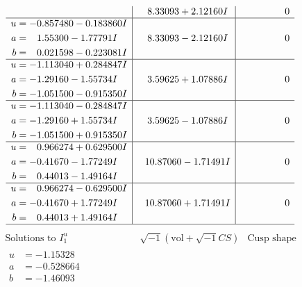 \documentclass[1p]{elsarticle_modified}
\theoremstyle{definition}
\newcommand{\I}{\sqrt{-1}}
\begin{document}
$$\begin{array}{c|c|c}
 & \phantom{-}8.33093 + 2.12160 I & \phantom{-0.000000 } 0 \\ \hline\begin{aligned}
u &= -0.857480 - 0.183860 I \\
a &= \phantom{-}1.55300 - 1.77791 I \\
b &= \phantom{-}0.021598 - 0.223081 I\end{aligned}
 & \phantom{-}8.33093 - 2.12160 I & \phantom{-0.000000 } 0 \\ \hline\begin{aligned}
u &= -1.113040 + 0.284847 I \\
a &= -1.29160 - 1.55734 I \\
b &= -1.051500 - 0.915350 I\end{aligned}
 & \phantom{-}3.59625 + 1.07886 I & \phantom{-0.000000 } 0 \\ \hline\begin{aligned}
u &= -1.113040 - 0.284847 I \\
a &= -1.29160 + 1.55734 I \\
b &= -1.051500 + 0.915350 I\end{aligned}
 & \phantom{-}3.59625 - 1.07886 I & \phantom{-0.000000 } 0 \\ \hline\begin{aligned}
u &= \phantom{-}0.966274 + 0.629500 I \\
a &= -0.41670 - 1.77249 I \\
b &= \phantom{-}0.44013 - 1.49164 I\end{aligned}
 & \phantom{-}10.87060 - 1.71491 I & \phantom{-0.000000 } 0 \\ \hline\begin{aligned}
u &= \phantom{-}0.966274 - 0.629500 I \\
a &= -0.41670 + 1.77249 I \\
b &= \phantom{-}0.44013 + 1.49164 I\end{aligned}
 & \phantom{-}10.87060 + 1.71491 I & \phantom{-0.000000 } 0\\
 \hline 
 \end{array}$$\newpage$$\begin{array}{c|c|c}  
\text{Solutions to }I^u_{1}& \I (\text{vol} + \sqrt{-1}CS) & \text{Cusp shape}\\
 \hline 
\begin{aligned}
u &= -1.15328\phantom{ +0.000000I} \\
a &= -0.528664\phantom{ +0.000000I} \\
b &= -1.46093\phantom{ +0.000000I}\end{aligned}

\end{array}$$
\end{document}
